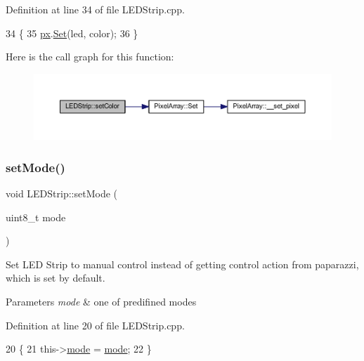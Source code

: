 Definition at line 34 of file L\+E\+D\+Strip.\+cpp.


\begin{DoxyCode}
34                                                        \{
35     \hyperlink{class_l_e_d_strip_aa8a8764862dbb64aedc0b53cfe3fc22b}{px}.\hyperlink{class_pixel_array_afcfe32b74beeced27f928f42131d77c1}{Set}(led, color);
36 \}
\end{DoxyCode}
Here is the call graph for this function\+:\nopagebreak
\begin{figure}[H]
\begin{center}
\leavevmode
\includegraphics[width=350pt]{class_l_e_d_strip_a1f9d9c2784c9ad893163f7f17e603ce7_cgraph}
\end{center}
\end{figure}
\mbox{\label{class_l_e_d_strip_abf199367f3caaf9730262c4e7bef6bc1}} 
\subsubsection{\texorpdfstring{set\+Mode()}{setMode()}}
{\footnotesize\ttfamily void L\+E\+D\+Strip\+::set\+Mode (\begin{DoxyParamCaption}\item[{uint8\+\_\+t}]{mode }\end{DoxyParamCaption})}



Set L\+ED Strip to manual control instead of getting control action from paparazzi, which is set by default. 


\begin{DoxyParams}{Parameters}
{\em mode} & one of predifined modes \\
\hline
\end{DoxyParams}


Definition at line 20 of file L\+E\+D\+Strip.\+cpp.


\begin{DoxyCode}
20                                    \{
21     this->\hyperlink{class_l_e_d_strip_ac209f99d6a633cd4c672fc16a991f4f8}{mode} = \hyperlink{class_l_e_d_strip_ac209f99d6a633cd4c672fc16a991f4f8}{mode};
22 \}
\end{DoxyCode}
\mbox{\label{class_abstract_component_a58a59a9ea6c3b4c86fb3bf98ff1eaaef}} 
